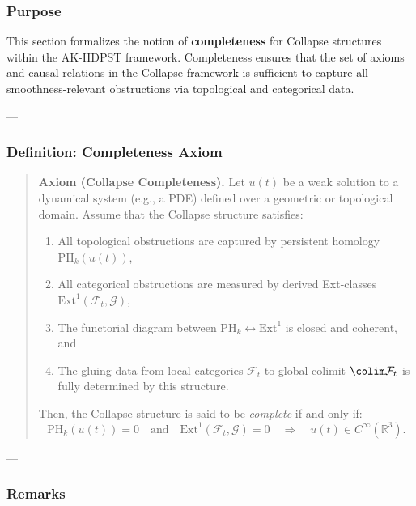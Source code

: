 \documentclass[11pt]{article}
\begin{document}
\begin{axiom}
\begin{axiom}
{{\subsubsection*{Purpose}

This section formalizes the notion of \textbf{completeness} for Collapse structures within the AK-HDPST framework.  
Completeness ensures that the set of axioms and causal relations in the Collapse framework is sufficient  
to capture all smoothness-relevant obstructions via topological and categorical data.

---

\subsubsection*{Definition: Completeness Axiom}

\begin{quote}
\textbf{Axiom (Collapse Completeness).}  
Let \( u(t) \) be a weak solution to a dynamical system (e.g., a PDE) defined over a geometric or topological domain.  
Assume that the Collapse structure satisfies:

\begin{enumerate}
  \item All topological obstructions are captured by persistent homology \(\mathrm{PH}_k(u(t))\),
  \item All categorical obstructions are measured by derived Ext-classes \(\mathrm{Ext}^1(\mathcal{F}_t, \mathcal{G})\),
  \item The functorial diagram between \(\mathrm{PH}_k \leftrightarrow \mathrm{Ext}^1\) is closed and coherent, and
  \item The gluing data from local categories \(\mathcal{F}_t\) to global colimit \(\colim \mathcal{F}_t\) is fully determined by this structure.
\end{enumerate}

Then, the Collapse structure is said to be \emph{complete} if and only if:
\[
\mathrm{PH}_k(u(t)) = 0 \quad \text{and} \quad \mathrm{Ext}^1(\mathcal{F}_t, \mathcal{G}) = 0 \quad \Longrightarrow \quad u(t) \in C^\infty(\mathbb{R}^3).
\]
\end{quote}

---

\subsubsection*{Remarks}

}}
\end{axiom}
\end{axiom}
\end{document}
